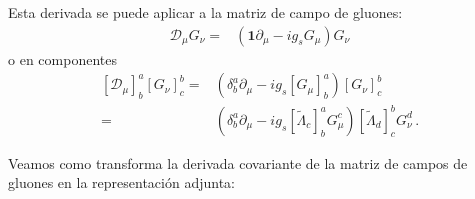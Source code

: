 \begin{frame}
Esta derivada se puede aplicar a la matriz de campo de gluones:
\begin{align}
  \mathcal{D}_{\mu}  G_{\nu}=& \left(\mathbf{1}\partial_{\mu}-i g_s  G_{\mu} \right)G_{\nu}
\end{align}
o en componentes
\begin{align}
  \left[ \mathcal{D}_{\mu} \right]^{a}_{b} \left[ G_{\nu} \right]^b_c=& \left(\delta^a_b\partial_{\mu}-i g_s \left[ G_{\mu} \right]^{a}_{b} \right)\left[ G_{\nu} \right]^b_c \nonumber\\
    =& \left(\delta^a_b\partial_{\mu}-i g_s \left[  \widetilde{\Lambda}_c \right]^a_b G^c_{\mu} \right) \left[  \widetilde{\Lambda}_d \right]^b_cG_{\nu}^{d}\,.
\end{align}
\end{frame}
Veamos como transforma la derivada covariante de la matriz de campos de gluones en la representación adjunta:
